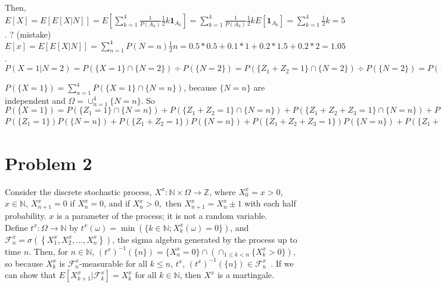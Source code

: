 \documentclass[12pt]{article}
\newcommand{\then}[0] { \textrm{ then } }
\newcommand{\nats}[0] { \mathbb{N}}
\newcommand{\ints}[0] { \mathbb{Z}}
\newcommand{\F}[0] { \mathcal{F} }
\newcommand{\om}[0] { \omega }
\newcommand{\Om}[0] { \Omega }
\newcommand{\rarw}[0] { \rightarrow }
\newcommand{ \cf }[1] { \mathbf{1}_{#1} }
\begin{document}
\noindent
Then, $E[X] = E[E[X|N]] = E \left[ \sum_{k=1}^4 \frac{1}{P(A_k)} \frac{1}{2} k \cf{A_k} \right] = \sum_{k=1}^4 \frac{1}{P(A_k)} \frac{1}{2} k  E [ \cf{A_k} ] = \sum_{k=1}^4  \frac{1}{2} k= 5 $. ? (mistake) \\

\noindent 
$E[x] = E[E[X | N]] = \sum_{n=1}^4 P(N=n) \frac{1}{2} n = 0.5*0.5+0.1*1+0.2*1.5+0.2*2 = 1.05$. \\

\noindent
$P(X=1|N=2) = P(\{X=1\} \cap \{ N=2\}) \div P( \{ N=2\}) = P( \{ Z_1 + Z_2 = 1 \}  \cap \{ N=2\} ) \div P( \{ N=2\}) = P( \{ Z_1 = 1, Z_2 = 0 \} \cup \{ Z_1 = 0, Z_2 = 1 \} ) \div P( \{ N=2\}) = 2*0.5*0.5*0.1 = 0.05$ \\

\noindent

$P( \{ X=1 \} ) = \sum_{n=1}^4 P( \{ X=1 \} \cap  \{ N = n \})$, because $ \{ N = n \}$ are independent and $\Om = \cup_{n=1}^4  \{ N = n \}$. So $P( \{ X=1 \} )= P( \{ Z_1 = 1 \} \cap  \{ N = n \} ) + P( \{ Z_1 + Z_2 = 1 \} \cap  \{ N = n \} ) + P( \{ Z_1 + Z_2 + Z_3 = 1  \} \cap \{ N = n  \} )+ P( \{ Z_1 + Z_2 + Z_3 + Z_4 = 1 \} \cap  \{ N = n \} ) =  $ $ P( \{ Z_1 = 1 \} ) P( \{ N = n \} ) + P( \{ Z_1 + Z_2 = 1 \} ) P(\{ N = n \} ) + P( \{ Z_1 + Z_2 + Z_3 = 1 \} ) P( \{ N = n  \} )+ P( \{ Z_1 + Z_2 + Z_3 + Z_4 = 1 \} ) P(\{ N = n \} ) = \sum_{n=1}^4 0.5 * n * P(\{ N = n \}) $








\section*{Problem 2}

Consider the discrete stochastic process, $X^x: \nats \times \Om \rarw \ints$, where $X^x_0 = x> 0$, $x \in \nats$, $X^x_{n+1} = 0$ if $X^x_n=0$, and if $X^x_n>0, \then X^x_{n+1} = X^x_n \pm 1$ with each half probability. $x$ is a parameter of the process; it is not a random variable.\\

\noindent
Define $t^x : \Om \rarw \nats$ by $t^x(\om) = \min(\{ k \in \nats; X^x_k(\om) = 0 \})$, and $\F^x_n = \sigma \left( \left \{  X^x_1, X^x_2, ... , X^x_n \right \} \right)$, the sigma algebra generated by the process up to time $n$. Then, for $n \in \nats$, $(t^x)^{-1}(\{ n\}) = \{ X^x_n = 0\} \cap \left( \cap_{1 \le k < n} \{ X^x_k > 0\} \right)$, so because $X^x_k$ is $ \F^x_n$-measurable for all $k \le n$, $t^x$, $(t^x)^{-1}(\{ n\}) \in \F^x_n$~. If we can show that $E[ X^x_{k+1} | \F^x_k ] = X^x_k$ for all $k \in \nats$, then $X^x$ is a martingale. \\
\end{document}
